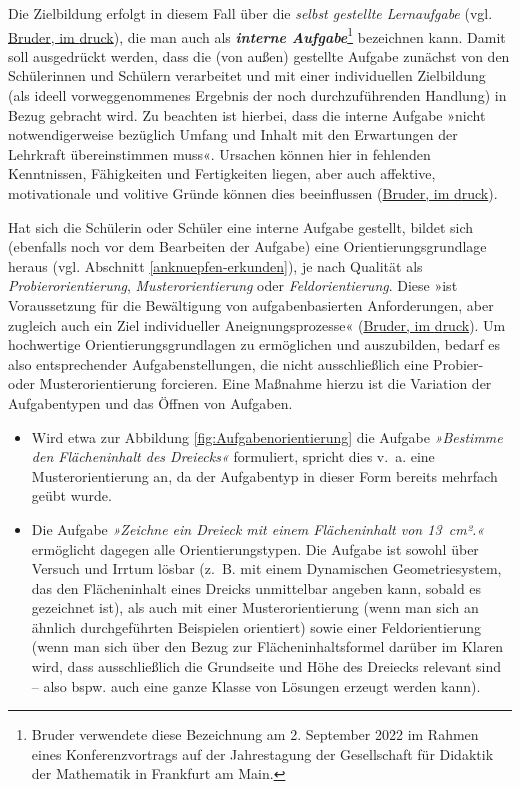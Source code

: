 \documentclass[
]{scrbook}
\providecommand{\tightlist}{%
  \setlength{\itemsep}{0pt}\setlength{\parskip}{0pt}}
\theoremstyle{definition}
\theoremstyle{definition}
\theoremstyle{definition}
\theoremstyle{definition}
\theoremstyle{remark}
\begin{document}
Die Zielbildung erfolgt in diesem Fall über die \emph{selbst gestellte Lernaufgabe} (vgl. \protect\hyperlink{ref-Bruderb}{Bruder, im {d}ruck}), die man auch als \textbf{\emph{interne Aufgabe}}\footnote{Bruder verwendete diese Bezeichnung am 2. September 2022 im Rahmen eines Konferenzvortrags auf der Jahrestagung der Gesellschaft für Didaktik der Mathematik in Frankfurt am Main.} bezeichnen kann. Damit soll ausgedrückt werden, dass die (von außen) gestellte Aufgabe zunächst von den Schülerinnen und Schülern verarbeitet und mit einer individuellen Zielbildung (als ideell vorweggenommenes Ergebnis der noch durchzuführenden Handlung) in Bezug gebracht wird. Zu beachten ist hierbei, dass die interne Aufgabe »nicht notwendigerweise bezüglich Umfang und Inhalt mit den Erwartungen der Lehrkraft übereinstimmen muss«. Ursachen können hier in fehlenden Kenntnissen, Fähigkeiten und Fertigkeiten liegen, aber auch affektive, motivationale und volitive Gründe können dies beeinflussen (\protect\hyperlink{ref-Bruderb}{Bruder, im {d}ruck}).

Hat sich die Schülerin oder Schüler eine interne Aufgabe gestellt, bildet sich (ebenfalls noch vor dem Bearbeiten der Aufgabe) eine Orientierungsgrundlage heraus (vgl. Abschnitt \ref{anknuepfen-erkunden}), je nach Qualität als \emph{Probierorientierung}, \emph{Musterorientierung} oder \emph{Feldorientierung}. Diese »ist Voraussetzung für die Bewältigung von aufgabenbasierten Anforderungen, aber zugleich auch ein Ziel individueller Aneignungsprozesse« (\protect\hyperlink{ref-Bruderb}{Bruder, im {d}ruck}). Um hochwertige Orientierungsgrundlagen zu ermöglichen und auszubilden, bedarf es also entsprechender Aufgabenstellungen, die nicht ausschließlich eine Probier- oder Musterorientierung forcieren. Eine Maßnahme hierzu ist die Variation der Aufgabentypen und das Öffnen von Aufgaben.

\begin{itemize}
\tightlist
\item
  Wird etwa zur Abbildung \ref{fig:Aufgabenorientierung} die Aufgabe \emph{»Bestimme den Flächeninhalt des Dreiecks«} formuliert, spricht dies v.~a. eine Musterorientierung an, da der Aufgabentyp in dieser Form bereits mehrfach geübt wurde.
\item
  Die Aufgabe \emph{»Zeichne ein Dreieck mit einem Flächeninhalt von 13~cm².«} ermöglicht dagegen alle Orientierungstypen. Die Aufgabe ist sowohl über Versuch und Irrtum lösbar (z.~B. mit einem Dynamischen Geometriesystem, das den Flächeninhalt eines Dreicks unmittelbar angeben kann, sobald es gezeichnet ist), als auch mit einer Musterorientierung (wenn man sich an ähnlich durchgeführten Beispielen orientiert) sowie einer Feldorientierung (wenn man sich über den Bezug zur Flächeninhaltsformel darüber im Klaren wird, dass ausschließlich die Grundseite und Höhe des Dreiecks relevant sind -- also bspw. auch eine ganze Klasse von Lösungen erzeugt werden kann).
\end{itemize}
\end{document}
